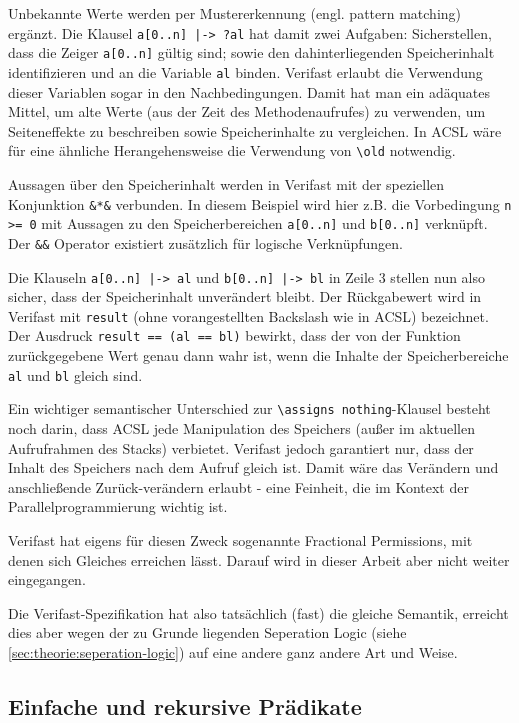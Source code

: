 Unbekannte Werte werden per Mustererkennung (engl. pattern matching) ergänzt. Die Klausel
\lstinline{a[0..n] |-> ?al} hat damit zwei Aufgaben: Sicherstellen, dass die Zeiger \lstinline{a[0..n]}
gültig sind; sowie den dahinterliegenden Speicherinhalt identifizieren und an die Variable \lstinline{al}
binden. Verifast erlaubt die Verwendung dieser Variablen sogar in den Nachbedingungen. Damit hat man ein 
adäquates Mittel, um alte Werte (aus der Zeit des Methodenaufrufes) zu verwenden, um Seiteneffekte zu
beschreiben sowie Speicherinhalte zu vergleichen. In ACSL wäre für eine ähnliche Herangehensweise
die Verwendung von \lstinline{\old} notwendig.

Aussagen über den Speicherinhalt werden in Verifast mit der speziellen Konjunktion \lstinline{&*&} 
verbunden. In diesem Beispiel wird hier z.B. die Vorbedingung \lstinline{n >= 0} mit Aussagen zu den 
Speicherbereichen \lstinline{a[0..n]} und \lstinline{b[0..n]} verknüpft. Der \lstinline{&&} Operator 
existiert zusätzlich für logische Verknüpfungen.

Die Klauseln \lstinline{a[0..n] |-> al} und \lstinline{b[0..n] |-> bl} in Zeile 3 stellen nun also sicher, 
dass der Speicherinhalt unverändert bleibt. Der Rückgabewert wird in Verifast mit \lstinline{result} 
(ohne vorangestellten Backslash wie in ACSL) bezeichnet. Der Ausdruck \lstinline{result == (al == bl)} 
bewirkt, dass der von der Funktion zurückgegebene Wert genau dann wahr ist, wenn die Inhalte der 
Speicherbereiche \lstinline{al} und \lstinline{bl} gleich sind.

Ein wichtiger semantischer Unterschied zur \lstinline{\assigns nothing}-Klausel besteht noch darin, 
dass ACSL jede Manipulation des Speichers (außer im aktuellen Aufrufrahmen des Stacks) verbietet. 
Verifast jedoch garantiert nur, dass der Inhalt des Speichers nach dem Aufruf gleich ist. Damit wäre 
das Verändern und anschließende Zurück-verändern erlaubt - eine Feinheit, die im Kontext der
Parallelprogrammierung wichtig ist.

Verifast hat eigens für diesen Zweck sogenannte Fractional Permissions, mit denen sich Gleiches
erreichen lässt. Darauf wird in dieser Arbeit aber nicht weiter eingegangen.

Die Verifast-Spezifikation hat also tatsächlich (fast) die gleiche Semantik, erreicht dies aber wegen der 
zu Grunde liegenden Seperation Logic (siehe \ref{sec:theorie:seperation-logic}) auf eine andere ganz 
andere Art und Weise.

\subsection{Einfache und rekursive Prädikate}
\label{sec:design-by-contract:predicates}

